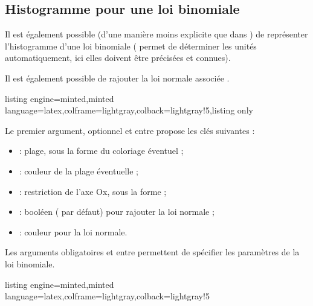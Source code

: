 \documentclass[11pt,a4paper]{ltxdoc}
\begin{document}
\subsection{Histogramme pour une loi binomiale}\label{histobinom}

Il est également possible (d'une manière moins explicite que dans ) de représenter l'histogramme d'une loi binomiale ( permet de déterminer les unités automatiquement, ici elles doivent être précisées et connues).

Il est également possible de rajouter la loi normale \og associée \fg.

\begin{tcblisting}{listing engine=minted,minted language=latex,colframe=lightgray,colback=lightgray!5,listing only}
\end{tcblisting}

Le premier argument, optionnel et entre \MontreCode{[...]} propose les clés suivantes :

\begin{itemize}

	\item {} : plage, sous la forme  du coloriage éventuel ;
	\item {} : couleur de la plage éventuelle ;
	\item {} : restriction de l'axe Ox, sous la forme  ;
	\item {} : booléen ( par défaut) pour rajouter la loi normale ;
	\item {} : couleur pour la loi normale.
\end{itemize}

Les arguments obligatoires et entre  permettent de spécifier les paramètres de la loi binomiale.

\begin{tcblisting}{listing engine=minted,minted language=latex,colframe=lightgray,colback=lightgray!5}
\begin{GraphiqueTikz}[x=0.2cm,y=50cm,Origx=-0.5,Xmin=-0.5,Xmax=50.5,
	Xgrille=5,Xgrilles=1,Ymin=0,Ymax=0.12,Ygrille=0.01,Ygrilles=0.001]
\end{GraphiqueTikz}
\end{tcblisting}
\end{document}
